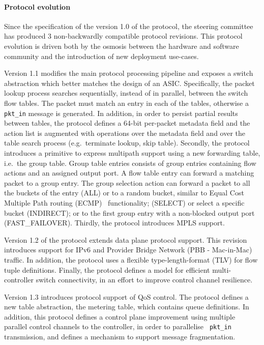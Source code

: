 \paragraph{Protocol evolution} 

Since the specification of the version 1.0 of the protocol, the \of steering
committee has produced 3 non-backwardly compatible protocol revisions. This
protocol evolution is driven both by the osmosis between the hardware and
software community and the introduction of new deployment use-cases. 

Version 1.1  modifies the main protocol processing pipeline and exposes a switch
abstraction which better matches the design of an ASIC\@. Specifically, the packet
lookup process searches sequentially, instead of in parallel, between the switch
flow tables.  The packet must match an entry in each of the tables, otherwise a
{\tt pkt\_in} message is generated. In addition, in order to persist partial
results between tables, the protocol defines a 64-bit per-packet metadata field
and the action list is augmented with operations over the metadata field and
over the table search process (e.g.~terminate lookup, skip table).  Secondly,
the protocol introduces a primitive to express multipath support
using a new forwarding table, i.e.~the group table.  Group table entries consists of
group entries containing flow actions and an assigned output port. A flow table
entry can forward a matching packet to a group entry. The group selection action
can forward a packet to all the buckets of the entry (ALL) or to a random
bucket, similar to Equal Cost Multiple Path routing (ECMP)~
functionality; (SELECT) or select a specific bucket (INDIRECT); or to the first
group entry with a non-blocked output port (FAST\_FAILOVER).  Thirdly, the
protocol introduces MPLS support.

Version 1.2 of the protocol extends data plane protocol support. This revision
introduces support for IPv6 and Provider Bridge Network (PBB - Mac-in-Mac)
traffic. In addition, the protocol uses a flexible type-length-format (TLV) for
flow tuple definitions.  Finally, the protocol defines a model for efficient
multi-controller switch connectivity, in an effort to improve control channel 
resilience.

Version 1.3 introduces protocol support of QoS control. The protocol defines a
new table abstraction, the metering table, which contains queue definitions. In
addition, this protocol defines a control plane improvement using multiple
parallel control channels to the controller, in order to parallelise {\tt
  pkt\_in} transmission, and defines a mechanism to support message
fragmentation.  

